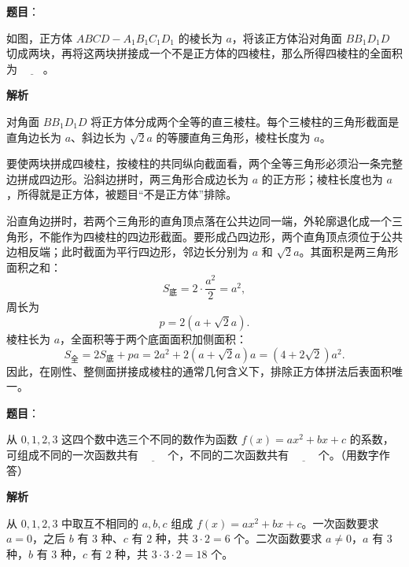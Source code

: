 \begin{answer}

\textbf{题目}：

如图，正方体 $ABCD-A_1B_1C_1D_1$ 的棱长为 $a$，将该正方体沿对角面 $BB_1D_1D$ 切成两块，再将这两块拼接成一个不是正方体的四棱柱，那么所得四棱柱的全面积为 $\underline{\qquad}$。
\nopagebreak[4]
\begin{center}\end{center}
\nopagebreak[4]
\textbf{解析}

对角面 $BB_1D_1D$ 将正方体分成两个全等的直三棱柱。每个三棱柱的三角形截面是直角边长为 $a$、斜边长为 $\sqrt2a$ 的等腰直角三角形，棱柱长度为 $a$。

要使两块拼成四棱柱，按棱柱的共同纵向截面看，两个全等三角形必须沿一条完整边拼成四边形。沿斜边拼时，两三角形合成边长为 $a$ 的正方形；棱柱长度也为 $a$，所得就是正方体，被题目“不是正方体”排除。

沿直角边拼时，若两个三角形的直角顶点落在公共边同一端，外轮廓退化成一个三角形，不能作为四棱柱的四边形截面。要形成凸四边形，两个直角顶点须位于公共边相反端；此时截面为平行四边形，邻边长分别为 $a$ 和 $\sqrt2a$。其面积是两三角形面积之和：
\nopagebreak[4]
\[
S_{\text{底}}=2\cdot\frac{a^2}{2}=a^2,
\]
周长为
\nopagebreak[4]
\[
p=2(a+\sqrt2a).
\]
棱柱长为 $a$，全面积等于两个底面面积加侧面积：
\nopagebreak[4]
\[
S_{\text{全}}=2S_{\text{底}}+pa
=2a^2+2(a+\sqrt2a)a
=(4+2\sqrt2)a^2.
\]
因此，在刚性、整侧面拼接成棱柱的通常几何含义下，排除正方体拼法后表面积唯一。


\end{answer}
\begin{answer}

\textbf{题目}：

从 $0,1,2,3$ 这四个数中选三个不同的数作为函数 $f(x)=ax^2+bx+c$ 的系数，可组成不同的一次函数共有 $\underline{\qquad}$ 个，不同的二次函数共有 $\underline{\qquad}$ 个。（用数字作答）

\textbf{解析}

从 $0,1,2,3$ 中取互不相同的 $a,b,c$ 组成 $f(x)=ax^2+bx+c$。一次函数要求 $a=0$，之后 $b$ 有 $3$ 种、$c$ 有 $2$ 种，共 $3\cdot2=6$ 个。二次函数要求 $a\ne0$，$a$ 有 $3$ 种，$b$ 有 $3$ 种，$c$ 有 $2$ 种，共 $3\cdot3\cdot2=18$ 个。


\end{answer}
